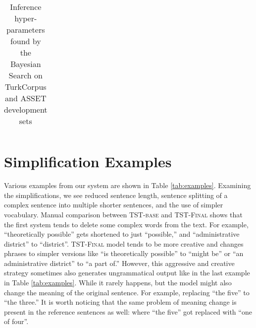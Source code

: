 \documentclass[11pt,a4paper]{article}
\begin{document}
{\begin{table*}[b]
\begin{center}
\begin{tabular}{ccccccc}
\bottomrule
\end{tabular}
\caption{Inference hyper-parameters found by the Bayesian Search on TurkCorpus and ASSET development sets}
\label{tab:inference_tweaks}
\end{center}
\end{table*}

\newpage

\section{Simplification Examples}

Various examples from our system are shown in Table \ref{tab:examples}. Examining the simplifications, we see reduced sentence length, sentence splitting of a complex sentence into multiple shorter sentences, and the use of simpler vocabulary. Manual comparison between \textsc{TST-base} and \textsc{TST-Final} shows that the first system tends to delete some complex words from the text. For example, ``theoretically possible” gets shortened to just ``possible,” and ``administrative district” to ``district”. \textsc{TST-Final} model tends to be more creative and changes phrases to simpler versions like “is theoretically possible” to ``might be” or ``an administrative district” to ``a part of.” However, this aggressive and creative strategy sometimes also generates ungrammatical output like in the last example in Table \ref{tab:examples}. While it rarely happens, but the model might also change the meaning of the original sentence. For example, replacing ``the five” to ``the three.” It is worth noticing that the same problem of meaning change is present in the reference sentences as well: where ``the five” got replaced with ``one of four”.




}
\end{document}
